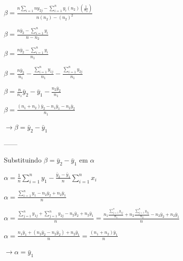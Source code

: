 \documentclass[11pt,]{article}
\begin{document}
\(\beta = \frac{n \sum_{i=1}{n}y_{2j} - \sum_{i=1}^n y_{i}(n_{2})(\frac{1}{n_{2}})}{n(n_{2})-(n_{2})^2}\)

\(\beta = \frac{n \bar y_{2} - \sum_{i=1}^n y_{i}}{n-n_{2}}\)

\(\beta = \frac{n \bar y_{2} - \sum_{i=1}^n y_{i}}{n_{1}}\)

\(\beta = \frac{n \bar y_{2}}{n_{1}} - \frac{ \sum_{i=1}^n y_{1j}}{n_{1}} - \frac{\sum_{i=1}^n y_{2j}}{n_{1}}\)

\(\beta = \frac{n}{n_{1}}\bar y_{2} - \bar y_{1} - \frac{n_{2} \bar y_{2}}{n_{1}}\)

\(\beta = \frac{(n_{1}+n_{2})\bar y_{2} - n_{1}\bar y_{1} - n_{2} \bar y_{2}}{n_{1}}\)

\(\rightarrow \beta = \bar y_{2} - \bar y_{1}\)

------

Substituindo \(\beta = \bar y_{2} - \bar y_{1}\) em \(\alpha\)

\(\alpha= \frac{1}{n} \sum_{i=1}^n y_{1} - \frac{ \bar y_{2} - \bar y_{1}}{n} \sum_{i=1}^n x_{i}\)

\(\alpha= \frac {\sum_{i=1}^n y_{1} - n_{2} \bar y_{2} + n_{2} \bar y_{1}}{n}\)

\(\alpha=\frac {\sum_{j=1}^n y_{1j} + \sum_{j=1}^n y_{2j} - n_{2} \bar y_{2} + n_{2} \bar y_{1}}{n}=\frac {n_{1} \frac{\sum_{j=1}^n y_{1j}}{n_{1}} + n_{2} \frac{\sum_{j=1}^n y_{2j}}{n_{2}} - n_{2} \bar y_{2} + n_{2} \bar y_{1}}{n}\)

\(\alpha= \frac{n_{1} \bar y_{1} + (n_{2} \bar y_{2} - n_{2} \bar y_{2}) + n_{2} \bar y_{1}}{n}= \frac{(n_{1}+n_{2}) \bar y_{1}}{n}\)

\(\rightarrow \alpha = \bar y_{1}\)

\newpage
\singlespacing 

\end{document}
